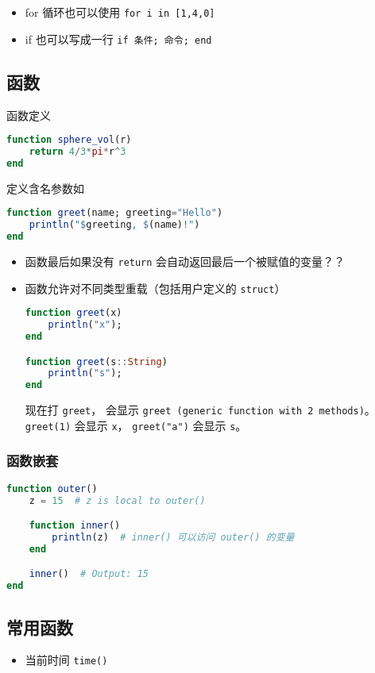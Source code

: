 \begin{itemize}
\item for 循环也可以使用 \verb`for i in [1,4,0]`
\item if 也可以写成一行 \verb`if 条件; 命令; end`
\end{itemize}

\subsection{函数}
函数定义
\begin{lstlisting}[language=julia]
function sphere_vol(r)
    return 4/3*pi*r^3
end
\end{lstlisting}

定义含名参数如
\begin{lstlisting}[language=julia]
function greet(name; greeting="Hello")
    println("$greeting, $(name)!")
end
\end{lstlisting}

\begin{itemize}
\item 函数最后如果没有 \verb`return` 会自动返回最后一个被赋值的变量？？
\item 函数允许对不同类型重载（包括用户定义的 \verb`struct`）
\begin{lstlisting}[language=julia]
function greet(x)
    println("x");
end

function greet(s::String)
    println("s");
end
\end{lstlisting}
现在打 \verb`greet`， 会显示 \verb`greet (generic function with 2 methods)`。 \verb`greet(1)` 会显示 \verb`x`， \verb`greet("a")` 会显示 \verb`s`。
\end{itemize}

\subsubsection{函数嵌套}
\begin{lstlisting}[language=julia]
function outer()
    z = 15  # z is local to outer()

    function inner()
        println(z)  # inner() 可以访问 outer() 的变量
    end

    inner()  # Output: 15
end
\end{lstlisting}


\subsection{常用函数}
\begin{itemize}
\item 当前时间 \verb`time()`
\end{itemize}

